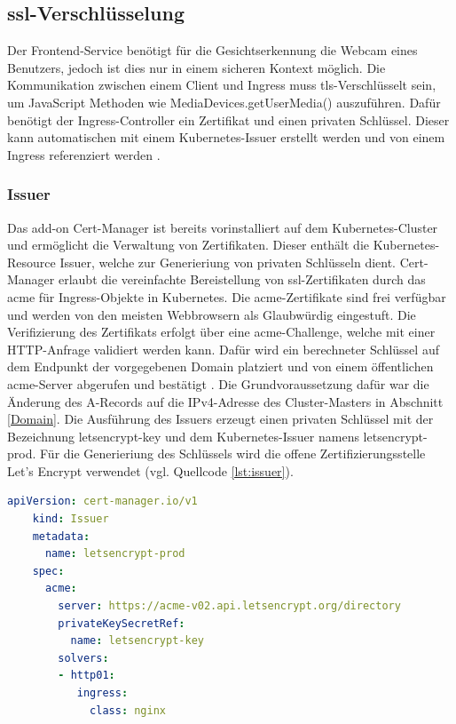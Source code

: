 \subsection{\acs{ssl}-Verschlüsselung}

Der Frontend-Service benötigt für die Gesichtserkennung die Webcam eines Benutzers, jedoch ist dies nur in einem sicheren Kontext möglich.
Die Kommunikation zwischen einem Client und Ingress muss \acs{tls}-Verschlüsselt sein, um JavaScript Methoden wie MediaDevices.getUserMedia() auszuführen.
Dafür benötigt der Ingress-Controller ein Zertifikat und einen privaten Schlüssel.
Dieser kann automatischen mit einem Kubernetes-Issuer erstellt werden und von einem Ingress referenziert werden \cite{certmanager}.

\subsubsection{Issuer}
Das add-on Cert-Manager ist bereits vorinstalliert auf dem Kubernetes-Cluster und ermöglicht die Verwaltung von Zertifikaten.
Dieser enthält die Kubernetes-Resource Issuer, welche zur Generieriung von privaten Schlüsseln dient.
Cert-Manager erlaubt die vereinfachte Bereistellung von \ac{ssl}-Zertifikaten durch das \ac{acme} für Ingress-Objekte in Kubernetes.
Die \acs{acme}-Zertifikate sind frei verfügbar und werden von den meisten Webbrowsern als Glaubwürdig eingestuft.
Die Verifizierung des Zertifikats erfolgt über eine \acs{acme}-Challenge, welche mit einer HTTP-Anfrage validiert werden kann.
Dafür wird ein berechneter Schlüssel auf dem Endpunkt der vorgegebenen Domain platziert und von einem öffentlichen \acs{acme}-Server abgerufen und bestätigt \cite{certmanageracme}.
Die Grundvoraussetzung dafür war die Änderung des A-Records auf die IPv4-Adresse des Cluster-Masters in Abschnitt \ref{Domain}.
Die Ausführung des Issuers erzeugt einen privaten Schlüssel mit der Bezeichnung letsencrypt-key und dem Kubernetes-Issuer namens letsencrypt-prod. 
Für die Generieriung des Schlüssels wird die offene Zertifizierungsstelle Let's Encrypt verwendet \cite{letsencrypt} (vgl. Quellcode \ref{lst:issuer}). 

\begin{lstlisting}[caption={issuer.yaml \cite{certmanageracme} },captionpos=b,label={lst:issuer},language=yaml]
    apiVersion: cert-manager.io/v1
    kind: Issuer
    metadata:
      name: letsencrypt-prod
    spec:
      acme:
        server: https://acme-v02.api.letsencrypt.org/directory
        privateKeySecretRef:
          name: letsencrypt-key
        solvers:
        - http01:
           ingress:
             class: nginx

\end{lstlisting}



